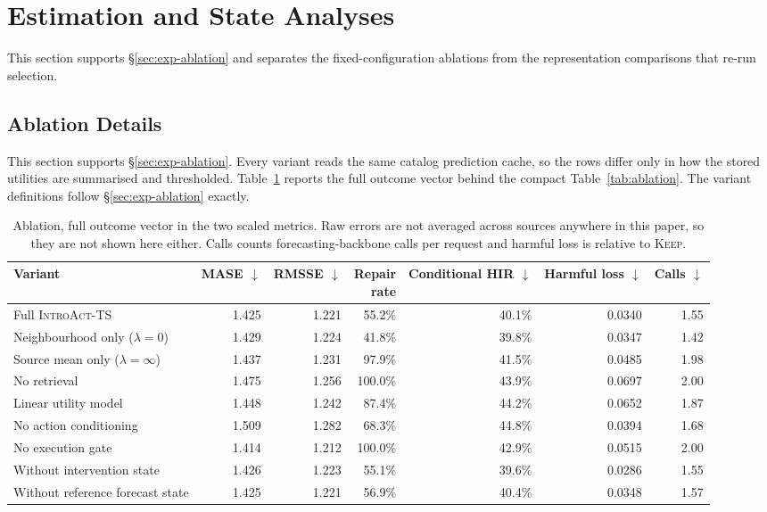 \documentclass{article}
\newcommand{\introact}{\textsc{IntroAct-TS}}
\newcommand{\loss}{\ell}
\begin{document}
\section{Estimation and State Analyses}

This section supports \S\ref{sec:exp-ablation} and separates the fixed-configuration
ablations from the representation comparisons that re-run selection.

\subsection{Ablation Details}
\label{app:ablation-details}
This section supports \S\ref{sec:exp-ablation}. Every variant reads the same catalog
prediction cache, so the rows differ only in how the stored utilities are summarised and
thresholded. Table~\ref{tab:app-ablation} reports the full outcome vector behind the compact
Table~\ref{tab:ablation}. The variant definitions follow \S\ref{sec:exp-ablation} exactly.

\begin{table}[htbp]
  \caption{Ablation, full outcome vector in the two scaled metrics. Raw errors are not
  averaged across sources anywhere in this paper, so they are not shown here either. Calls
  counts forecasting-backbone calls per request and harmful loss is relative to
  \textsc{Keep}.}
  \label{tab:app-ablation}
  \centering
  \small
  \setlength{\tabcolsep}{4pt}
\begin{tabularx}{\textwidth}{@{}Xrrrrrr@{}}
    \toprule
    Variant & MASE $\downarrow$ & RMSSE $\downarrow$ & \shortstack[r]{Repair\\rate} & \shortstack[r]{Conditional\\HIR $\downarrow$} & \shortstack[r]{Harmful\\loss $\downarrow$} & Calls $\downarrow$ \\
    \midrule
    Full \introact{} & 1.425 & 1.221 & 55.2\% & 40.1\% & 0.0340 & 1.55 \\
    Neighbourhood only ($\lambda=0$) & 1.429 & 1.224 & 41.8\% & 39.8\% & 0.0347 & 1.42 \\
    Source mean only ($\lambda=\infty$) & 1.437 & 1.231 & 97.9\% & 41.5\% & 0.0485 & 1.98 \\
    No retrieval & 1.475 & 1.256 & 100.0\% & 43.9\% & 0.0697 & 2.00 \\
    Linear utility model & 1.448 & 1.242 & 87.4\% & 44.2\% & 0.0652 & 1.87 \\
    No action conditioning & 1.509 & 1.282 & 68.3\% & 44.8\% & 0.0394 & 1.68 \\
    No execution gate & 1.414 & 1.212 & 100.0\% & 42.9\% & 0.0515 & 2.00 \\
    Without intervention state & 1.426 & 1.223 & 55.1\% & 39.6\% & 0.0286 & 1.55 \\
    Without reference forecast state & 1.425 & 1.221 & 56.9\% & 40.4\% & 0.0348 & 1.57 \\
    \midrule
    \bottomrule
  \end{tabularx}
\end{table}
\end{document}
